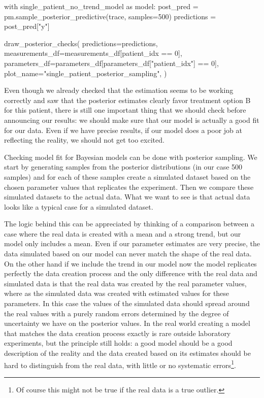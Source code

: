 \documentclass[12pt,a4paper,leqno]{report}
\theoremstyle{plain}
\theoremstyle{definition}
\theoremstyle{remark}
\begin{document}
\bigskip
\begin{pyverbatim}[][fontsize=\footnotesize]
    with single_patient_no_trend_model as model:
        post_pred = pm.sample_posterior_predictive(trace, samples=500)
        predictions = post_pred["y"]

    draw_posterior_checks(
        predictions=predictions,
        measurements_df=measurements_df[patient_idx == 0],
        parameters_df=parameters_df[parameters_df["patient_idx"] == 0],
        plot_name="single_patient_posterior_sampling",
    )
\end{pyverbatim}
\smallskip

Even though we already checked that the estimation seems to be working correctly and saw
that the posterior estimates clearly favor treatment option B for this patient, there is
still one important thing that we should check before announcing our results: we should
make sure that our model is actually a good fit for our data. Even if we have precise
results, if our model does a poor job at reflecting the reality, we should not get too excited.

Checking model fit for Bayesian models can be done with posterior sampling. We start by generating samples from
the posterior distributions (in our case 500 samples) and for each of these samples create a simulated dataset based
on the chosen parameter values that replicates the experiment. Then we compare these
simulated datasets to the actual data. What we want to see is that actual data looks
like a typical case for a simulated dataset.

The logic behind this can be appreciated by thinking of a comparison between a case
where the real data is created with a mean and a strong trend, but our model only includes a
mean. Even if our parameter estimates are very precise, the data simulated based on our
model can never match the shape of the real data. On the other hand if we include the trend in our
model now the model replicates perfectly the data creation process and
the only difference with the real data and simulated data is that the real data was
created by the real parameter values, where as the simulated data was created with
estimated values for these parameters. In this case the values of the simulated data
should spread around the real values with a purely random errors determined by the degree
of uncertainty we have on the posterior values. In the real world creating a model that
matches the data creation process exactly is rare outside laboratory experiments, but
the principle still holds: a good model should be a good description of the reality and
the data created based on its estimates should be hard to distinguish from the real
data, with little or no systematic errors\footnote{Of course this might not be true if the
real data is a true outlier.}.
\end{document}
